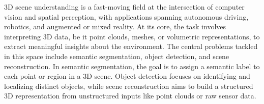 

3D scene understanding is a fast-moving field at the intersection of computer vision
and spatial perception, with applications spanning autonomous driving, robotics, and
augmented or mixed reality. At its core, the task involves interpreting 3D data,
be it point clouds, meshes, or volumetric representations, to extract meaningful
insights about the environment.
%
The central problems tackled in this space include semantic segmentation,
object detection, and scene reconstruction. In semantic segmentation, the goal
is to assign a semantic label to each point or region in a 3D scene. Object
detection focuses on identifying and localizing distinct objects, while scene
reconstruction aims to build a structured 3D representation from unstructured
inputs like point clouds or raw sensor data.
%

